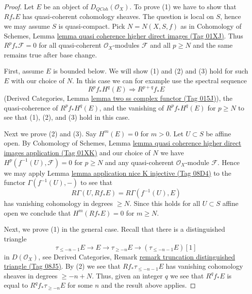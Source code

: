 \documentclass{amsart}
\theoremstyle{plain}
\theoremstyle{definition}
\theoremstyle{remark}
\numberwithin{equation}{subsection}
\def\QCoh{\mathit{QCoh}}
\begin{document}
\begin{proof}
Let $E$ be an object of $D_\QCoh(\mathcal{O}_X)$. To prove (1) we have to
show that $Rf_*E$ has quasi-coherent cohomology sheaves. The question is local
on $S$, hence we may assume $S$ is quasi-compact. Pick $N = N(X, S, f)$ as in
Cohomology of Schemes, Lemma
\href{https://stacks.math.columbia.edu/tag/01XJ}{lemma quasi coherence higher direct images (Tag 01XJ)}.
Thus $R^pf_*\mathcal{F} = 0$ for all quasi-coherent $\mathcal{O}_X$-modules
$\mathcal{F}$ and all $p \geq N$ and the same remains true after base change.

\medskip\noindent
First, assume $E$ is bounded below. We will show (1) and (2) and (3) hold
for such $E$ with our choice of $N$. In this case we can for example use the
spectral sequence
$$
R^pf_*H^q(E) \Rightarrow R^{p + q}f_*E
$$
(Derived Categories, Lemma \href{https://stacks.math.columbia.edu/tag/015J}{lemma two ss complex functor (Tag 015J)}),
the quasi-coherence of $R^pf_*H^q(E)$, and the vanishing of $R^pf_*H^q(E)$
for $p \geq N$ to see that (1), (2), and (3) hold in this case.

\medskip\noindent
Next we prove (2) and (3). Say $H^m(E) = 0$ for $m > 0$.
Let $U \subset S$ be affine open. By Cohomology of Schemes, Lemma
\href{https://stacks.math.columbia.edu/tag/01XK}{lemma quasi coherence higher direct images application (Tag 01XK)}
and our choice of $N$
we have $H^p(f^{-1}(U), \mathcal{F}) = 0$ for $p \geq N$
and any quasi-coherent $\mathcal{O}_X$-module $\mathcal{F}$.
Hence we may apply Lemma \href{https://stacks.math.columbia.edu/tag/08D4}{lemma application nice K injective (Tag 08D4)}
to the functor $\Gamma(f^{-1}(U), -)$ to see that
$$
R\Gamma(U, Rf_*E) = R\Gamma(f^{-1}(U), E)
$$
has vanishing cohomology in degrees $\geq N$. Since this holds for
all $U \subset S$ affine open we conclude that $H^m(Rf_*E) = 0$
for $m \geq N$.

\medskip\noindent
Next, we prove (1) in the general case. Recall that there is a
distinguished triangle
$$
\tau_{\leq -n - 1}E \to E \to \tau_{\geq -n}E \to
(\tau_{\leq -n - 1}E)[1]
$$
in $D(\mathcal{O}_X)$, see Derived Categories, Remark
\href{https://stacks.math.columbia.edu/tag/08J5}{remark truncation distinguished triangle (Tag 08J5)}.
By (2) we see that $Rf_*\tau_{\leq -n - 1}E$
has vanishing cohomology sheaves in degrees $\geq -n + N$.
Thus, given an integer $q$ we see that $R^qf_*E$ is equal
to $R^qf_*\tau_{\geq -n}E$ for some $n$ and the result
above applies.
\end{proof}
\end{document}
